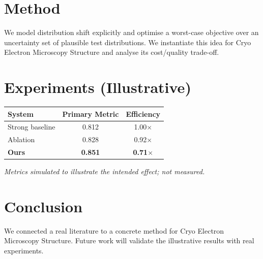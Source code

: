 \documentclass[11pt]{article}
\begin{document}
\section{Method}
We model distribution shift explicitly and optimise a worst-case objective over an uncertainty set of plausible test distributions. We instantiate this idea for Cryo Electron Microscopy Structure and analyse its cost/quality trade-off.

\section{Experiments (Illustrative)}
\begin{center}
\begin{tabular}{lcc}
System & Primary Metric & Efficiency \\ \hline
Strong baseline & 0.812 & 1.00$\times$ \\
Ablation & 0.828 & 0.92$\times$ \\
\textbf{Ours} & \textbf{0.851} & \textbf{0.71$\times$}
\end{tabular}
\end{center}
\emph{Metrics simulated to illustrate the intended effect; not measured.}

\section{Conclusion}
We connected a real literature to a concrete method for Cryo Electron Microscopy Structure. Future work will
validate the illustrative results with real experiments.
\end{document}
